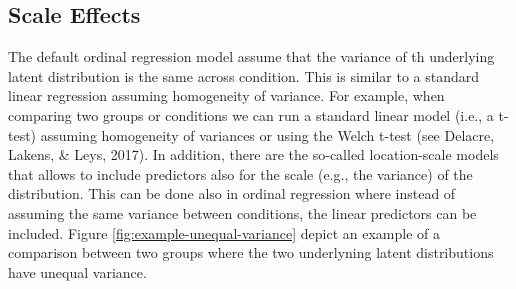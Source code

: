 \documentclass[
  man,floatsintext]{apa6}
\newenvironment{Shaded}{\begin{snugshade}}{\end{snugshade}}
\newcommand{\AttributeTok}[1]{\textcolor[rgb]{0.13,0.29,0.53}{#1}}
\newcommand{\CommentTok}[1]{\textcolor[rgb]{0.56,0.35,0.01}{\textit{#1}}}
\newcommand{\ConstantTok}[1]{\textcolor[rgb]{0.56,0.35,0.01}{#1}}
\newcommand{\ControlFlowTok}[1]{\textcolor[rgb]{0.13,0.29,0.53}{\textbf{#1}}}
\newcommand{\DecValTok}[1]{\textcolor[rgb]{0.00,0.00,0.81}{#1}}
\newcommand{\FunctionTok}[1]{\textcolor[rgb]{0.13,0.29,0.53}{\textbf{#1}}}
\newcommand{\NormalTok}[1]{#1}
\newcommand{\OtherTok}[1]{\textcolor[rgb]{0.56,0.35,0.01}{#1}}
\newcommand{\SpecialCharTok}[1]{\textcolor[rgb]{0.81,0.36,0.00}{\textbf{#1}}}
\begin{document}
\begin{Shaded}
\end{Shaded}

\normalsize

\subsection{Scale Effects}\label{scale-effects}

The default ordinal regression model assume that the variance of th underlying latent distribution is the same across condition. This is similar to a standard linear regression assuming homogeneity of variance. For example, when comparing two groups or conditions we can run a standard linear model (i.e., a t-test) assuming homogeneity of variances or using the Welch t-test (see Delacre, Lakens, \& Leys, 2017). In addition, there are the so-called location-scale models that allows to include predictors also for the scale (e.g., the variance) of the distribution. This can be done also in ordinal regression where instead of assuming the same variance between conditions, the linear predictors can be included. Figure \ref{fig:example-unequal-variance} depict an example of a comparison between two groups where the two underlyning latent distributions have unequal variance.
\end{document}
